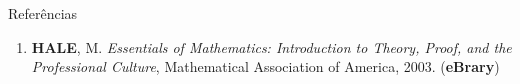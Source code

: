 \begin{frame}[fragile]{Referências}

    \begin{enumerate}
        \item \textbf{HALE}, M. \textit{Essentials of Mathematics: Introduction to Theory, Proof, and the Professional Culture}, Mathematical Association of America, 2003. (\textbf{eBrary})

    \end{enumerate}

\end{frame}
